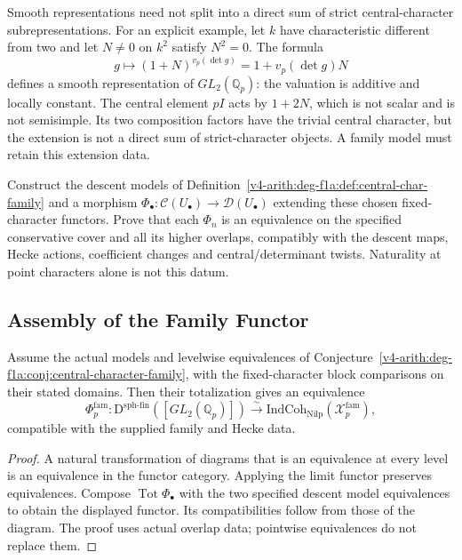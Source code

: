 \begin{remark}
\label{v4-arith:deg-f1a:rem:fibre-decomp-standard}
Smooth representations need not split into a direct sum of strict
central-character subrepresentations. For an explicit example,
let \(k\) have characteristic different from two and let \(N\ne0\)
on \(k^2\) satisfy \(N^2=0\). The formula
\[
 g\longmapsto (1+N)^{v_p(\det g)}=1+v_p(\det g)N
\]
defines a smooth representation of \(GL_2(\mathbb Q_p)\): the
valuation is additive and locally constant. The central element
\(pI\) acts by \(1+2N\), which is not scalar and is not
semisimple. Its two composition factors have the trivial central
character, but the extension is not a direct sum of strict-character
objects. A family model must retain this extension data.
\end{remark}

\begin{conjecture}
\label{v4-arith:deg-f1a:conj:central-character-family}
Construct the descent models of
Definition~\ref{v4-arith:deg-f1a:def:central-char-family} and a
morphism \(\Phi_\bullet:\mathcal C(U_\bullet)\to\mathcal D(U_\bullet)\)
extending these chosen fixed-character functors. Prove that each
\(\Phi_n\) is an equivalence on the specified conservative cover
and all its higher overlaps, compatibly with the descent maps,
Hecke actions, coefficient changes and central/determinant twists.
Naturality at point characters alone is not this datum.
\end{conjecture}

\subsection{Assembly of the Family Functor}
\begin{theorem}
\label{v4-arith:deg-f1a:thm:central-character-variation}
Assume the actual models and levelwise equivalences of
Conjecture~\ref{v4-arith:deg-f1a:conj:central-character-family},
with the fixed-character block comparisons on their stated domains.
Then their totalization gives an equivalence
\begin{equation}
\label{v4-arith:deg-f1a:eq:varying-chi}
 \Phi_p^{\mathrm{fam}}:
 \mathrm D^{\mathrm{sph\text{-}fin}}([GL_2(\mathbb Q_p)])
 \xrightarrow{\sim}
 \mathrm{IndCoh}_{\mathrm{Nilp}}(\mathcal X_p^{\mathrm{fam}}),
\end{equation}
compatible with the supplied family and Hecke data.
\end{theorem}
\begin{proof}
A natural transformation of diagrams that is an equivalence at
every level is an equivalence in the functor category. Applying
the limit functor preserves equivalences. Compose
\(\operatorname{Tot}\Phi_\bullet\) with the two specified descent
model equivalences to obtain the displayed functor. Its
compatibilities follow from those of the diagram. The proof uses
actual overlap data; pointwise equivalences do not replace them.
\end{proof}

